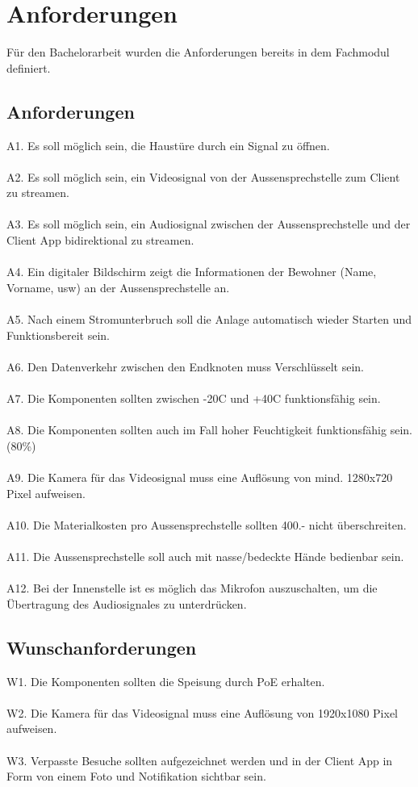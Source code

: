 \section{Anforderungen}
Für den Bachelorarbeit wurden die Anforderungen bereits in dem Fachmodul definiert.
\subsection{Anforderungen}
A1. Es soll möglich sein, die Haustüre durch ein Signal zu öffnen. 
\\
\\
A2. Es soll möglich sein, ein Videosignal von der Aussensprechstelle zum Client zu streamen. 
\\
\\
A3. Es soll möglich sein, ein Audiosignal zwischen der Aussensprechstelle und der Client App bidirektional zu streamen. 
\\
\\
A4. Ein digitaler Bildschirm zeigt die Informationen der Bewohner (Name, Vorname, usw) an der Aussensprechstelle an. 
\\
\\
A5. Nach einem Stromunterbruch soll die Anlage automatisch wieder Starten und Funktionsbereit sein. 
\\
\\
A6. Den Datenverkehr zwischen den Endknoten muss Verschlüsselt sein. 
\\
\\
A7. Die Komponenten sollten zwischen -20C und +40C funktionsfähig sein. 
\\
\\
A8. Die Komponenten sollten auch im Fall hoher Feuchtigkeit funktionsfähig sein. (80\%) 
\\
\\
A9. Die Kamera für das Videosignal muss eine Auflösung von mind. 1280x720 Pixel aufweisen.  
\\
\\
A10. Die Materialkosten pro Aussensprechstelle sollten 400.- nicht überschreiten. 
\\
\\
A11. Die Aussensprechstelle soll auch mit nasse/bedeckte Hände bedienbar sein. 
\\
\\
A12. Bei der Innenstelle ist es möglich das Mikrofon auszuschalten, um die Übertragung des Audiosignales zu unterdrücken. 

\subsection{Wunschanforderungen}
W1. Die Komponenten sollten die Speisung durch PoE erhalten. 
\\
\\
W2. Die Kamera für das Videosignal muss eine Auflösung von 1920x1080 Pixel aufweisen. 
\\
\\
W3. Verpasste Besuche sollten aufgezeichnet werden und in der Client App in Form von einem Foto und Notifikation sichtbar sein.
\newpage

